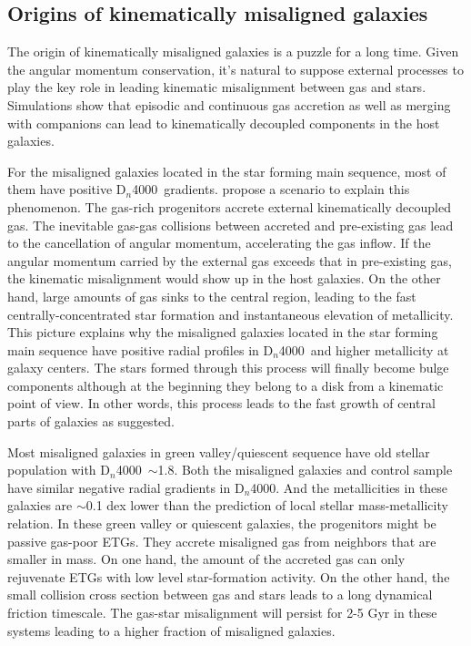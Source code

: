 \documentclass[a4paper,fleqn,usenatbib]{mnras}
\newcommand{\dindex}{D$_n$4000}
\begin{document}
\subsection{Origins of kinematically misaligned galaxies}\label{sec:discuss_origin}

The origin of kinematically misaligned galaxies is a puzzle for a long time. 
Given the angular momentum conservation, it's natural to suppose external 
processes to play the key role in leading kinematic misalignment between gas and stars. 
Simulations show that episodic and continuous gas accretion 
\citep{thakar-1996, thakar-1998} as well as merging with companions 
\citep{bois-2011, naab-2014} can lead to kinematically decoupled components in the host galaxies. 

For the misaligned galaxies located in the star forming main sequence, most of them have positive \dindex\ gradients. 
\cite{chen-prep} propose a scenario to explain this phenomenon. 
The gas-rich progenitors accrete external kinematically decoupled gas. 
The inevitable gas-gas collisions between accreted and pre-existing gas lead to the cancellation of angular momentum, accelerating 
the gas inflow. If the angular momentum carried by the external gas exceeds that 
in pre-existing gas, the kinematic misalignment would show up in the host galaxies. On the other hand, 
large amounts of gas sinks to the central region, leading to the fast centrally-concentrated star formation 
and instantaneous elevation of metallicity. This picture explains why the misaligned galaxies located in the star 
forming main sequence have positive radial profiles in \dindex\ and higher metallicity at galaxy centers.
The stars formed through this process will finally become bulge components although at the beginning 
they belong to a disk from a kinematic point of view. In other words, this process 
leads to the fast growth of central parts of galaxies as \cite{chen-prep} suggested.

Most misaligned galaxies in green valley/quiescent sequence have old stellar population with \dindex\ $\sim$1.8. 
Both the misaligned galaxies and control sample have similar negative radial 
gradients in \dindex. And the metallicities in these galaxies are $\sim$0.1 dex lower 
than the prediction of local stellar mass-metallicity relation. 
In these green valley or quiescent galaxies, the progenitors might be passive gas-poor ETGs. 
They accrete misaligned gas from neighbors that are smaller in mass. 
On one hand, the amount of the accreted gas can only rejuvenate ETGs with low level star-formation activity.
On the other hand, the small collision cross section between gas and stars leads to a long dynamical friction timescale.
The gas-star misalignment will persist for 2-5 Gyr \citep{voort-2015, davis-2016} in these systems leading to a higher fraction of misaligned galaxies.
\end{document}
